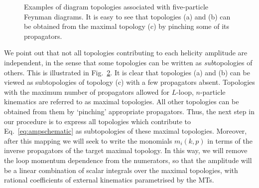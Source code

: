 \documentclass[main.tex]{subfiles}
\begin{document}
\begin{figure}
\begin{subfigure}[b]{0.3\textwidth}
    \caption{} \label{fig:topologyc}
    \end{subfigure}
\caption{Examples of diagram topologies associated with five-particle Feynman diagrams. It is easy to see that topologies (a) and (b) can be obtained from the maximal topology (c) by pinching some of its propagators.}
\label{fig:topologies}
\end{figure}

We point out that not all topologies contributing to each helicity amplitude are independent, in the sense that some topologies can be written as \textit{sub}topologies of others. This is illustrated in Fig.~\ref{fig:topologies}. It is clear that topologies (a) and (b) can be viewed as subtopologies of topology (c) with a few propagators absent. Topologies with the maximum number of propagators allowed for $L$-loop, $n$-particle kinematics are referred to as maximal topologies. All other topologies can be obtained from them by `pinching' appropriate propagators. Thus, the next step in our procedure is to express all topologies which contribute to Eq.~\ref{eq:ampschematic} as subtopologies of these maximal topologies. Moreover, after this mapping we will seek to write the monomials $m_i(k, p)$ in terms of the inverse propagators of the target maximal topology. In this way, we will remove the loop momentum dependence from the numerators, so that the amplitude will be a linear combination of scalar integrals over the maximal topologies, with rational coefficients of external kinematics parametrised by the MTs.
\end{document}
